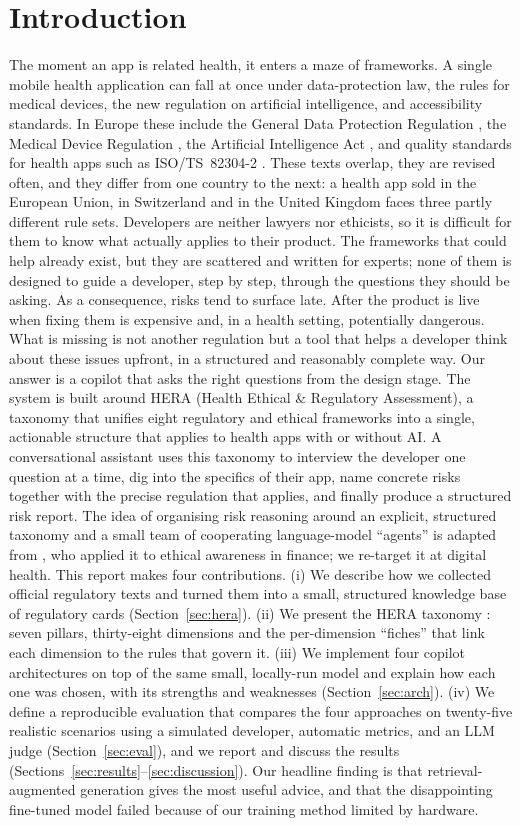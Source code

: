 \documentclass[11pt]{article}
\begin{document}
\section{Introduction}
The moment an app is related health, it enters a maze of frameworks. A single mobile
health application can fall at once under data-protection law, the rules for medical
devices, the new regulation on artificial intelligence, and accessibility standards.
In Europe these include the General Data Protection Regulation \citep{gdpr2016}, the
Medical Device Regulation \citep{mdr2017}, the Artificial Intelligence Act
\citep{euaiact2024}, and quality standards for health apps such as ISO/TS~82304-2
\citep{iso82304}. These texts overlap, they are revised often, and they differ from one
country to the next: a health app sold in the European Union, in Switzerland and in the
United Kingdom faces three partly different rule sets.
Developers are neither lawyers nor ethicists, so it is difficult for them to know what actually applies to their
product. The frameworks that could help already exist, but they are scattered and
written for experts; none of them is designed to guide a developer, step by step,
through the questions they should be asking. As a consequence, risks tend to surface
late. After the product is live when fixing them is expensive and, in a health
setting, potentially dangerous. What is missing is not another regulation but a tool
that helps a developer think about these issues upfront, in a structured and
reasonably complete way.
Our answer is a copilot that asks the right questions from the design stage. The system
is built around HERA (Health Ethical \& Regulatory Assessment), a taxonomy that
unifies eight regulatory and ethical frameworks into a single, actionable structure that
applies to health apps with or without AI. A conversational assistant uses this taxonomy
to interview the developer one question at a time, dig into the specifics of their app,
name concrete risks together with the precise regulation that applies, and finally
produce a structured risk report. The idea of organising risk reasoning around an
explicit, structured taxonomy and a small team of cooperating language-model
``agents'' is adapted from \citet{deng2025ethical}, who applied it to ethical awareness
in finance; we re-target it at digital health.
This report makes four contributions. (i) We describe how we collected official
regulatory texts and turned them into a small, structured knowledge base of regulatory
cards (Section~\ref{sec:hera}). (ii) We present the HERA taxonomy : seven
pillars, thirty-eight dimensions and the per-dimension ``fiches'' that link each
dimension to the rules that govern it. (iii) We implement four copilot
architectures on top of the same small, locally-run model and explain how each
one was chosen, with its strengths and weaknesses (Section~\ref{sec:arch}).
(iv) We define a reproducible evaluation that compares the four approaches on
twenty-five realistic scenarios using a simulated developer, automatic metrics, and an
LLM judge (Section~\ref{sec:eval}), and we report and discuss the results
(Sections~\ref{sec:results}--\ref{sec:discussion}). Our headline finding is that
retrieval-augmented generation gives the most useful advice, and that the disappointing
fine-tuned model failed because of our training method limited by hardware.
\end{document}
